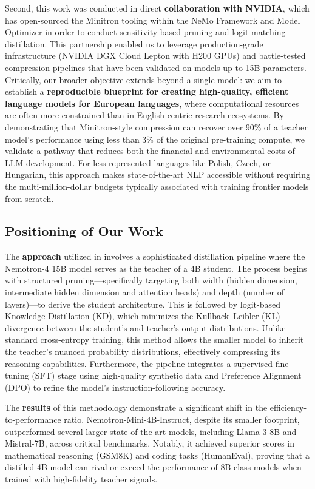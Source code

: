 \documentclass{article}
\begin{document}
Second, this work was conducted in direct \textbf{collaboration with NVIDIA}, which has open-sourced the Minitron tooling within the NeMo Framework and Model Optimizer \cite{nemo_minitron} in order to conduct sensitivity-based pruning and logit-matching distillation. This partnership enabled us to leverage production-grade infrastructure (NVIDIA DGX Cloud Lepton with H200 GPUs) and battle-tested compression pipelines that have been validated on models up to 15B parameters. Critically, our broader objective extends beyond a single model: we aim to establish a \textbf{reproducible blueprint for creating high-quality, efficient language models for European languages}, where computational resources are often more constrained than in English-centric research ecosystems. By demonstrating that Minitron-style compression can recover over 90\% of a teacher model's performance using less than 3\% of the original pre-training compute, we validate a pathway that reduces both the financial and environmental costs of LLM development. For less-represented languages like Polish, Czech, or Hungarian, this approach makes state-of-the-art NLP accessible without requiring the multi-million-dollar budgets typically associated with training frontier models from scratch.

\subsection{Positioning of Our Work}

The \textbf{approach} utilized in \cite{muralidharan2024compact} involves a sophisticated distillation pipeline where the Nemotron-4 15B  model \cite{parmar2024nemotron} serves as the teacher of a 4B student. The process begins with structured pruning---specifically targeting both width (hidden dimension, intermediate hidden dimension and attention heads) and depth (number of layers)---to derive the student architecture. This is followed by logit-based Knowledge Distillation (KD), which minimizes the Kullback--Leibler (KL) divergence between the student's and teacher's output distributions. Unlike standard cross-entropy training, this method allows the smaller model to inherit the teacher's nuanced probability distributions, effectively compressing its reasoning capabilities. Furthermore, the pipeline integrates a supervised fine-tuning (SFT) stage using high-quality synthetic data and Preference Alignment (DPO) \cite{rafailov2024direct} to refine the model's instruction-following accuracy.

The \textbf{results} of this methodology demonstrate a significant shift in the efficiency-to-performance ratio. Nemotron-Mini-4B-Instruct, despite its smaller footprint, outperformed several larger state-of-the-art models, including Llama-3-8B and Mistral-7B, across critical benchmarks. Notably, it achieved superior scores in mathematical reasoning (GSM8K) and coding tasks (HumanEval), proving that a distilled 4B model can rival or exceed the performance of 8B-class models when trained with high-fidelity teacher signals.
\end{document}
